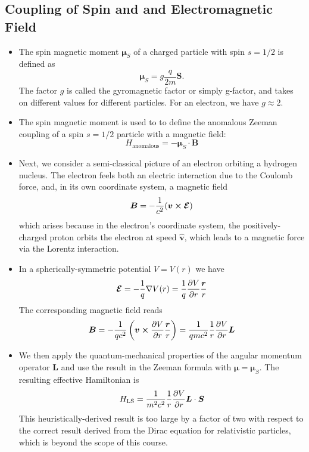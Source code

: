 \documentclass[11pt, a4paper]{article}
\renewcommand{\grad}{\nabla}
\renewcommand{\vec}[1]{\bm{#1}}  %
\newcommand{\uvec}[1]{\hat{\vec{#1}}}  %
\renewcommand{\r}{\vec{r}}  %
\renewcommand{\L}{\vec{L}}  %
\renewcommand{\S}{\vec{S}}  %
\newcommand{\B}{\vec{B}}  %
\newcommand{\m}{\vec{\mu}}  %
\begin{document}
\subsection{Coupling of Spin and and Electromagnetic Field}
\begin{itemize}
    \item The spin magnetic moment $ \m_{S} $ of a charged particle with spin $ s = 1/2 $ is defined as
	\begin{equation*}
		\m_{S} = g\frac{q}{2m} \S.
	\end{equation*}
    The factor $ g $ is called the gyromagnetic factor or simply g-factor, and takes on different values for different particles. For an electron, we have $ g \approx 2 $. 

    \item The spin magnetic moment is used to to define the anomalous Zeeman coupling of a spin $ s = 1/2 $ particle with a magnetic field:
	\begin{equation*}
		H_{\text{anomalous}} = - \m_{S} \cdot \B
	\end{equation*}
	
	\item Next, we consider a semi-classical picture of an electron orbiting a hydrogen nucleus. The electron feels both an electric interaction due to the Coulomb force, and, in its own coordinate system, a magnetic field 
	\begin{equation*}
		\B = -\frac{1}{c^{2}}(\vec{v} \cross \vec{\mathcal{E}})
	\end{equation*}
	which arises because in the electron's coordinate system, the positively-charged proton orbits the electron at speed $ \uvec{v} $, which leads to a magnetic force via the Lorentz interaction.
	
	\item In a spherically-symmetric potential $ V = V(r) $ we have
	\begin{equation*}
		\vec{\mathcal{E}} = - \frac{1}{q}\grad V(r) = \frac{1}{q}\pdv{V}{r} \frac{\r}{r}
	\end{equation*}
	The corresponding magnetic field reads
	\begin{equation*}
		\B = -\frac{1}{qc^{2}}\left(\vec{v} \cross \pdv{V}{r}\frac{\r}{r}\right) = \frac{1}{qmc^{2}}\frac{1}{r}\pdv{V}{r}\L
	\end{equation*}
	
	\item We then apply the quantum-mechanical properties of the angular momentum operator $ \L $ and use the result in the Zeeman formula with $ \m = \m_{S} $. The resulting effective Hamiltonian is
	\begin{equation*}
		H_{\text{LS}} = \frac{1}{m^{2}c^{2}}\frac{1}{r}\pdv{V}{r} \L \cdot \S
	\end{equation*}
	This heuristically-derived result is too large by a factor of two with respect to the correct result derived from the Dirac equation for relativistic particles, which is beyond the scope of this course. 
	

\end{itemize}
\end{document}
